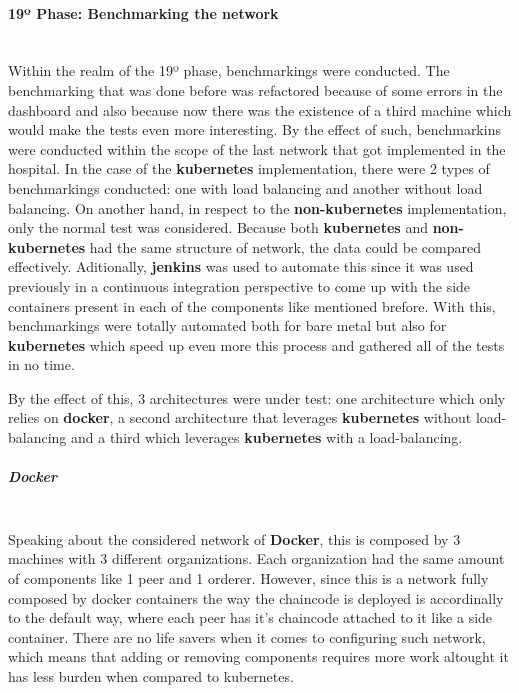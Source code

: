 \paragraph{19º Phase: Benchmarking the network}\mbox{}\\
Within the realm of the 19º phase, benchmarkings were conducted. The benchmarking that was done before was refactored because of some errors in the dashboard and also because now there was the existence of a third machine which would make the tests even more interesting. By the effect of such, benchmarkins were conducted within the scope of the last network that got implemented in the hospital. In the case of the \textbf{kubernetes} implementation, there were 2 types of benchmarkings conducted: one with load balancing and another without load balancing. On another hand, in respect to the \textbf{non-kubernetes} implementation, only the normal test was considered. Because both \textbf{kubernetes} and \textbf{non-kubernetes} had the same structure of network, the data could be compared effectively. Aditionally, \textbf{jenkins} was used to automate this since it was used previously in a continuous integration perspective to come up with the side containers present in each of the components like mentioned brefore. With this, benchmarkings were totally automated both for bare metal but also for \textbf{kubernetes} which speed up even more this process and gathered all of the tests in no time.

By the effect of this, 3 architectures were under test: one architecture which only relies on \textbf{docker}, a second architecture that leverages \textbf{kubernetes} without load-balancing and a third which leverages \textbf{kubernetes} with a load-balancing.

\subparagraph{Docker} \mbox{}\\
Speaking about the considered network of \textbf{Docker}, this is composed by 3 machines with 3 different organizations. Each organization had the same amount of components like 1 peer and 1 orderer. However, since this is a network fully composed by docker containers the way the chaincode is deployed is accordinally to the default way, where each peer has it's chaincode attached to it like a side container. There are no life savers when it comes to configuring such network, which means that adding or removing components requires more work altought it has less burden when compared to kubernetes.

